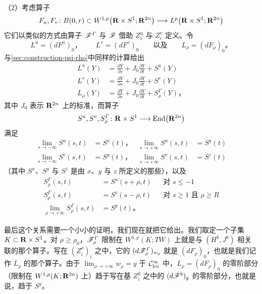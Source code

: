 （2）考虑算子
\[
F_{u},F_{v}\colon B(0,r)\subset W^{1,p}\bigl(\mathbf{R}\times S^{1};\mathbf{R}^{2n}\bigr)\longrightarrow L^{p}\bigl(\mathbf{R}\times S^{1};\mathbf{R}^{2n}\bigr)
\]
它们以类似的方式由\trFloer{}算子 $\mathscr{F}^{\varGamma}$ 与 $\mathscr{F}$ 借助\trTrivialization{} $Z_{i}^{u}$ 与 $Z_{i}^{v}$ 定义。令
\[
L^{u}=(dF^{u})_{0}\text{，}\qquad L^{v}=(dF^{v})_{0}\qquad\text{以及}\qquad L_{\rho}=(dF_{\rho})_{0}\text{。}
\]
与\cref{sec:construction-psi-rho}中同样的计算给出
\[
\begin{aligned}
L^{u}(Y)&=\frac{\partial Y}{\partial s}+J_{0}\frac{\partial Y}{\partial t}+S^{u}(Y)\\
L^{v}(Y)&=\frac{\partial Y}{\partial s}+J_{0}\frac{\partial Y}{\partial t}+S^{v}(Y)\\
L_{\rho}(Y)&=\frac{\partial Y}{\partial s}+J_{0}\frac{\partial Y}{\partial t}+S^{\varGamma}_{\rho}(Y)\text{，}
\end{aligned}
\]
其中 $J_{0}$ 表示 $\mathbf{R}^{2n}$ 上的标准\trComplexStructure，而算子
\[
S^{u},S^{v},S^{\varGamma}_{\rho}\colon\mathbf{R}\times S^{1}\longrightarrow\operatorname{End}\bigl(\mathbf{R}^{2n}\bigr)
\]
满足
\[
\begin{aligned}
\lim_{s\to-\infty}S^{u}(s,t)&=S^{x}(t)\text{，}&
\lim_{s\to+\infty}S^{u}(s,t)&=S^{y}(t)\\
\lim_{s\to-\infty}S^{v}(s,t)&=S^{y}(t)\text{，}&
\lim_{s\to+\infty}S^{v}(s,t)&=S^{z}(t)
\end{aligned}
\]
（其中 $S^{x}$、$S^{y}$ 与 $S^{z}$ 是由\trCriticalPoint{} $x$、$y$ 与 $z$ 所定义的那些\trSymmetricMatrix\trLoop），以及
\[
\begin{aligned}
S^{\varGamma}_{\rho}(s,t)&=S^{u}(s+\rho,t)&&\text{对 } s\le-1\\
S^{\varGamma}_{\rho}(s,t)&=S^{v}(s-\rho,t)&&\text{对 } s\ge1\text{ 且 }\rho\ge R\\
\lim_{\rho\to+\infty}S^{\varGamma}_{\rho}(s,t)&=S^{y}(t)\text{。}
\end{aligned}
\]

最后这个关系需要一个小小的证明，我们现在就把它给出。我们取定一个\trCompact{}子集 $K\subset\mathbf{R}\times S^{1}$。对 $\rho\ge\rho_{0}$，$\mathscr{F}^{\varGamma}_{\rho}$ 限制在 $W^{1,p}(K;TW)$ 上就是与 $(H^{b},J^{b})$ 相关联的那个\trFloer{}算子。写在\trTrivialization{} $(Z_{i}^{\rho})_{i}$ 之中，它的\trDifferential{} $(d\mathscr{F}^{\varGamma}_{\rho})_{w_{\rho}}$ 就是 $(dF_{\rho})_{0}$，也就是我们记作 $L_{\rho}$ 的那个算子。由于 $\lim_{\rho\to+\infty}w_{\rho}=y$ 于 $\mathcal{C}^{\infty}_{\mathrm{loc}}$ 中，$L_{\rho}=(dF_{\rho})_{0}$ 的零阶部分（限制在 $W^{1,p}(K;\mathbf{R}^{2n})$ 上）趋于写在基 $Z_{i}^{y}$ 之中的 $(d\mathscr{F}^{b})_{y}$ 的零阶部分，也就是说，趋于 $S^{y}$。

